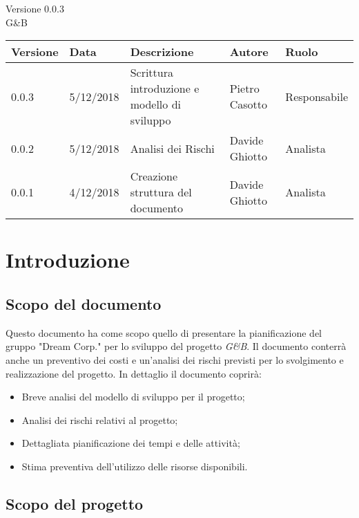 \documentclass[12pt]{article}
\title{\myfont{Piano di Progetto}}
\author{ }
\date{ \myfont 05-12-2018}
\begin{document}
	\maketitle
	\begin{center}
	\huge Versione 0.0.3 
	\\G\&B
	\end{center}
	\newpage
		\begin{tabularx}{\textwidth}{|X|X|X|X|X|}
				\hline
						\textbf{Versione} & \textbf{Data} & \textbf{Descrizione} & \textbf{Autore} & \textbf{Ruolo}\\
				\hline
						0.0.3 & 5/12/2018 & Scrittura introduzione e modello di sviluppo & Pietro Casotto & Responsabile \\
				\hline
						0.0.2 & 5/12/2018 & Analisi dei Rischi & Davide Ghiotto & Analista \\
				\hline
						0.0.1 & 4/12/2018 & Creazione struttura del documento & Davide Ghiotto & Analista  \\
				\hline
		\end{tabularx}
	\newpage
	\tableofcontents
	\newpage


	\section{Introduzione}
		\subsection{Scopo del documento}

			Questo documento ha come scopo quello di presentare la pianificazione del gruppo "Dream Corp." per lo sviluppo del progetto \textit{G\&B}.
			Il documento conterrà anche un preventivo dei costi e un'analisi dei rischi previsti per lo svolgimento e realizzazione del progetto.\newline
			In dettaglio il documento coprirà:
			\begin{itemize}
				\item Breve analisi del modello di sviluppo per il progetto; 
				\item Analisi dei rischi relativi al progetto;
				\item Dettagliata pianificazione dei tempi e delle attività;
				\item Stima preventiva dell'utilizzo delle risorse disponibili.
			\end{itemize}

		\subsection{Scopo del progetto}
\end{document}
